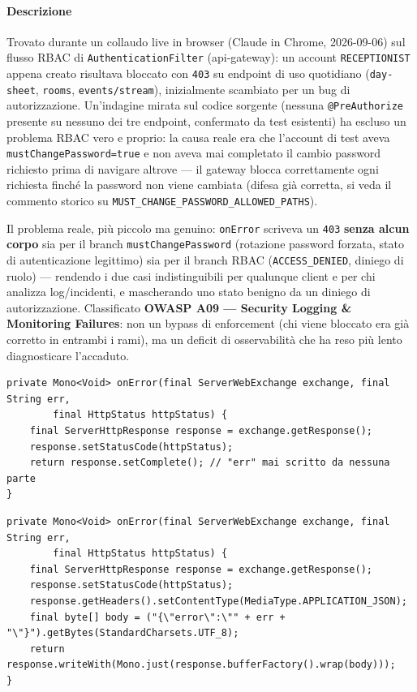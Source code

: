 ﻿\documentclass[a4paper,12pt]{report}
\begin{document}
\paragraph{Descrizione}
Trovato durante un collaudo live in browser (Claude in Chrome, 2026-09-06) sul flusso
RBAC di \texttt{AuthenticationFilter} (api-gateway): un account \texttt{RECEPTIONIST}
appena creato risultava bloccato con \texttt{403} su endpoint di uso quotidiano
(\texttt{day-sheet}, \texttt{rooms}, \texttt{events/stream}), inizialmente scambiato per
un bug di autorizzazione. Un'indagine mirata sul codice sorgente (nessuna
\texttt{@PreAuthorize} presente su nessuno dei tre endpoint, confermato da test
esistenti) ha escluso un problema RBAC vero e proprio: la causa reale era che
l'account di test aveva \texttt{mustChangePassword=true} e non aveva mai completato il
cambio password richiesto prima di navigare altrove --- il gateway blocca
correttamente ogni richiesta finché la password non viene cambiata (difesa già corretta,
si veda il commento storico su \texttt{MUST\_CHANGE\_PASSWORD\_ALLOWED\_PATHS}).

Il problema reale, più piccolo ma genuino: \texttt{onError} scriveva un \texttt{403}
\textbf{senza alcun corpo} sia per il branch \texttt{mustChangePassword} (rotazione
password forzata, stato di autenticazione legittimo) sia per il branch RBAC
(\texttt{ACCESS\_DENIED}, diniego di ruolo) --- rendendo i due casi indistinguibili per
qualunque client e per chi analizza log/incidenti, e mascherando uno stato benigno da un
diniego di autorizzazione. Classificato \textbf{OWASP A09 --- Security Logging \&
Monitoring Failures}: non un bypass di enforcement (chi viene bloccato era già corretto
in entrambi i rami), ma un deficit di osservabilità che ha reso più lento diagnosticare
l'accaduto.

\begin{insecurebox}[title={AuthenticationFilter.java --- 403 senza corpo, due cause indistinguibili (baseline)}]
\begin{lstlisting}[style=java]
private Mono<Void> onError(final ServerWebExchange exchange, final String err,
        final HttpStatus httpStatus) {
    final ServerHttpResponse response = exchange.getResponse();
    response.setStatusCode(httpStatus);
    return response.setComplete(); // "err" mai scritto da nessuna parte
}
\end{lstlisting}
\end{insecurebox}

\begin{securebox}[title={AuthenticationFilter.java --- corpo JSON con il motivo (main)}]
\begin{lstlisting}[style=java]
private Mono<Void> onError(final ServerWebExchange exchange, final String err,
        final HttpStatus httpStatus) {
    final ServerHttpResponse response = exchange.getResponse();
    response.setStatusCode(httpStatus);
    response.getHeaders().setContentType(MediaType.APPLICATION_JSON);
    final byte[] body = ("{\"error\":\"" + err + "\"}").getBytes(StandardCharsets.UTF_8);
    return response.writeWith(Mono.just(response.bufferFactory().wrap(body)));
}
\end{lstlisting}
\end{securebox}
\end{document}
